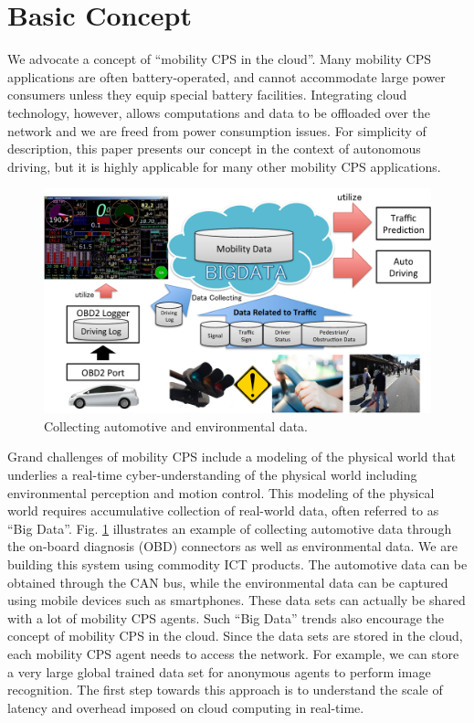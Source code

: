\section{Basic Concept}
\label{sec:concept}

We advocate a concept of ``mobility CPS in the cloud''.
Many mobility CPS applications are often battery-operated, and cannot
accommodate large power consumers unless they equip special battery
facilities.
Integrating cloud technology, however, allows computations and data to be
offloaded over the network and we are freed from power consumption
issues.
For simplicity of description, this paper presents our concept in the
context of autonomous driving, but it is highly applicable for many
other mobility CPS applications.

\begin{figure}[!t]
 \centering
 \includegraphics[width=\hsize]{fig/OBD2.pdf}
 \caption{Collecting automotive and environmental data.}
 \label{fig:obd2}
\end{figure}

Grand challenges of mobility CPS include a modeling of the physical
world that underlies a real-time cyber-understanding of the physical
world including environmental perception and motion control.
This modeling of the physical world requires accumulative collection of
real-world data, often referred to as ``Big Data''.
Fig. \ref{fig:obd2} illustrates an example of collecting automotive data
through the on-board diagnosis (OBD) connectors as well as environmental
data.
We are building this system using commodity ICT products. 
The automotive data can be obtained through the CAN bus, while the
environmental data can be captured using mobile devices such as
smartphones.
These data sets can actually be shared with a lot of mobility CPS
agents.
Such ``Big Data'' trends also encourage the concept of mobility CPS in
the cloud.
Since the data sets are stored in the cloud, each mobility CPS agent
needs to access the network.
For example, we can store a very large global trained data set
\cite{Niknejad12} for anonymous agents to perform image recognition.
The first step towards this approach is to understand the scale of
latency and overhead imposed on cloud computing in real-time.

